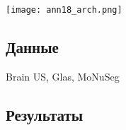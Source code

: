 \begin{minipage}{1.0\linewidth}
    \begin{center}
        \texttt{[image: ann18\_arch.png]} \\
    \end{center}
    
\end{minipage} 
\subsection*{Данные}
Brain US, Glas, MoNuSeg
\subsection*{Результаты}
    

